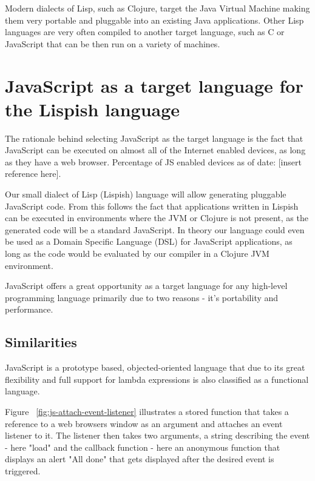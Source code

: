 Modern dialects of Lisp, such as Clojure, target the Java Virtual Machine making them very portable and pluggable into an existing Java applications.
Other Lisp languages are very often compiled to another target language, such as C or JavaScript that can be then run on a variety of machines.

\section{JavaScript as a target language for the Lispish language}
The rationale behind selecting JavaScript as the target language is the fact that JavaScript can be executed on almost all of the Internet enabled devices, as long as they have a web browser. Percentage of JS enabled devices as of date: [insert reference here].

Our small dialect of Lisp (Lispish) language will allow generating pluggable JavaScript code.
From this follows the fact that applications written in Lispish can be executed in environments where the JVM or Clojure is not present, as the generated code will be a standard JavaScript.
In theory our language could even be used as a Domain Specific Language (DSL) for JavaScript applications, as long as the code would be evaluated by our compiler in a Clojure JVM environment.

JavaScript offers a great opportunity as a target language for any high-level programming language primarily due to two reasons - it's portability and performance.

\subsection{Similarities}
JavaScript is a prototype based, objected-oriented language that due to its great flexibility and full support for lambda expressions is also classified as a functional language.



Figure ~\ref{fig:js-attach-event-listener}  illustrates a stored function that takes a reference to a web browsers window as an argument and attaches an event listener to it. The listener then takes two arguments, a string describing the event - here "load" and the callback function - here an anonymous function that displays an alert "All done" that gets displayed after the desired event is triggered.



